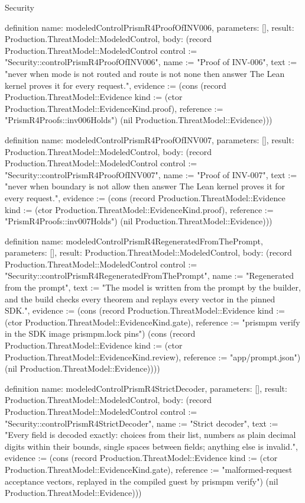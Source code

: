 \begin{lexlean}{Security}
\begin{semanticmodule}
definition{
  name: modeledControlPrismR4ProofOfINV006,
  parameters: [],
  result: Production.ThreatModel::ModeledControl,
  body: (record Production.ThreatModel::ModeledControl {control := "Security::controlPrismR4ProofOfINV006", name := "Proof of INV-006", text := "never when mode is not routed and route is not none then answer The Lean kernel proves it for every request.", evidence := (cons (record Production.ThreatModel::Evidence {kind := (ctor Production.ThreatModel::EvidenceKind.proof), reference := "PrismR4Proofs::inv006Holds"}) (nil Production.ThreatModel::Evidence))})
}

definition{
  name: modeledControlPrismR4ProofOfINV007,
  parameters: [],
  result: Production.ThreatModel::ModeledControl,
  body: (record Production.ThreatModel::ModeledControl {control := "Security::controlPrismR4ProofOfINV007", name := "Proof of INV-007", text := "never when boundary is not allow then answer The Lean kernel proves it for every request.", evidence := (cons (record Production.ThreatModel::Evidence {kind := (ctor Production.ThreatModel::EvidenceKind.proof), reference := "PrismR4Proofs::inv007Holds"}) (nil Production.ThreatModel::Evidence))})
}

definition{
  name: modeledControlPrismR4RegeneratedFromThePrompt,
  parameters: [],
  result: Production.ThreatModel::ModeledControl,
  body: (record Production.ThreatModel::ModeledControl {control := "Security::controlPrismR4RegeneratedFromThePrompt", name := "Regenerated from the prompt", text := "The model is written from the prompt by the builder, and the build checks every theorem and replays every vector in the pinned SDK.", evidence := (cons (record Production.ThreatModel::Evidence {kind := (ctor Production.ThreatModel::EvidenceKind.gate), reference := "prismpm verify in the SDK image prismpm.lock pins"}) (cons (record Production.ThreatModel::Evidence {kind := (ctor Production.ThreatModel::EvidenceKind.review), reference := "app/prompt.json"}) (nil Production.ThreatModel::Evidence)))})
}

definition{
  name: modeledControlPrismR4StrictDecoder,
  parameters: [],
  result: Production.ThreatModel::ModeledControl,
  body: (record Production.ThreatModel::ModeledControl {control := "Security::controlPrismR4StrictDecoder", name := "Strict decoder", text := "Every field is decoded exactly: choices from their list, numbers as plain decimal digits within their bounds, single spaces between fields; anything else is invalid.", evidence := (cons (record Production.ThreatModel::Evidence {kind := (ctor Production.ThreatModel::EvidenceKind.gate), reference := "malformed-request acceptance vectors, replayed in the compiled guest by prismpm verify"}) (nil Production.ThreatModel::Evidence))})
}


\end{semanticmodule}
\end{lexlean}
